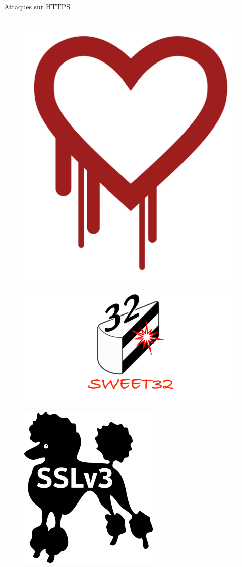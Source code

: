 \begin{frame}{Attaques sur HTTPS}
\begin{columns}
    \begin{column}{0.5\textwidth}
      \begin{figure}
        \includegraphics[width=0.32\linewidth]{../medias/heartbleed.png}
      \end{figure}
      \begin{figure}
        \includegraphics[width=0.32\linewidth]{../medias/sweet32.png}
      \end{figure}
      \begin{figure}
        \includegraphics[width=0.32\linewidth]{../medias/poodle.png}
      \end{figure}
    \end{column}
  \end{columns}

\end{frame}
